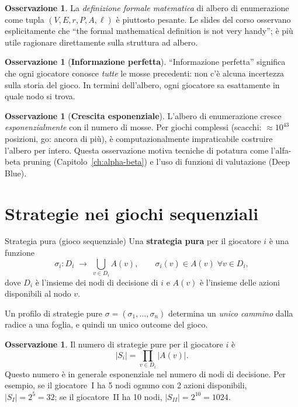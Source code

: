\documentclass[12pt,a4paper,twoside]{book}
\theoremstyle{plain}
\theoremstyle{definition}
\newtheorem{remark}[theorem]{Osservazione}
\begin{document}
\begin{remark}
La \emph{definizione formale matematica} di albero di enumerazione come tupla $(V, E, r, P, A, \ell)$ è piuttosto pesante. Le slides del corso osservano esplicitamente che ``the formal mathematical definition is not very handy''; è più utile ragionare direttamente sulla struttura ad albero.
\end{remark}

\begin{remark}[\textbf{Informazione perfetta}]
``Informazione perfetta'' significa che ogni giocatore conosce \emph{tutte} le mosse precedenti: non c'è alcuna incertezza sulla storia del gioco. In termini dell'albero, ogni giocatore sa esattamente in quale nodo si trova.
\end{remark}

\begin{remark}[\textbf{Crescita esponenziale}]
L'albero di enumerazione cresce \emph{esponenzialmente} con il numero di mosse. Per giochi complessi (scacchi: $\approx 10^{43}$ posizioni, go: ancora di più), è computazionalmente impraticabile costruire l'albero per intero. Questa osservazione motiva tecniche di potatura come l'alfa-beta pruning (Capitolo~\ref{ch:alpha-beta}) e l'uso di funzioni di valutazione (Deep Blue).
\end{remark}

\section{Strategie nei giochi sequenziali}

\begin{defbox}{Strategia pura (gioco sequenziale)}
Una \textbf{strategia pura} per il giocatore $i$ è una funzione
\[
  \sigma_i : D_i \;\longrightarrow\; \bigcup_{v \in D_i} A(v),
  \qquad \sigma_i(v)\in A(v)\;\forall v\in D_i,
\]
dove $D_i$ è l'insieme dei nodi di decisione di $i$ e $A(v)$ è l'insieme delle azioni disponibili al nodo $v$.

Un profilo di strategie pure $\sigma = (\sigma_1,\dots,\sigma_n)$ determina un \emph{unico cammino} dalla radice a una foglia, e quindi un unico outcome del gioco.
\end{defbox}

\begin{remark}
Il numero di strategie pure per il giocatore $i$ è
\[
  |S_i| = \prod_{v \in D_i} |A(v)|.
\]
Questo numero è in generale esponenziale nel numero di nodi di decisione. Per esempio, se il giocatore~I ha 5 nodi ognuno con 2 azioni disponibili, $|S_I| = 2^5 = 32$; se il giocatore~II ha 10 nodi, $|S_{II}| = 2^{10} = 1024$.
\end{remark}
\end{document}
